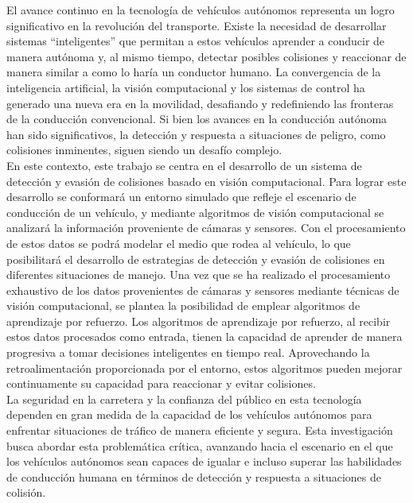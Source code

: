 \noindent
El avance continuo en la tecnología de vehículos autónomos representa un logro significativo en la revolución del transporte.
Existe la necesidad de desarrollar sistemas ``inteligentes'' que permitan a estos vehículos aprender a conducir de manera autónoma y,
al mismo tiempo, detectar posibles colisiones y reaccionar de manera similar a como lo haría un conductor humano.
La convergencia de la inteligencia artificial, la visión computacional y los sistemas de control ha generado una nueva era en la movilidad,
desafiando y redefiniendo las fronteras de la conducción convencional.
Si bien los avances en la conducción autónoma han sido significativos, la detección y respuesta a
situaciones de peligro, como colisiones inminentes, siguen siendo un desafío complejo.\\ \newline
En este contexto, este trabajo se centra en el desarrollo de un sistema de detección y evasión de colisiones basado en visión computacional.
Para lograr este desarrollo se conformará un entorno simulado que refleje el escenario de conducción de un vehículo,
y mediante algoritmos de visión computacional se analizará la información proveniente de cámaras y sensores.
Con el procesamiento de estos datos se podrá modelar el medio que rodea al vehículo, lo que posibilitará
el desarrollo de estrategias de detección y evasión de colisiones en diferentes situaciones de manejo.
Una vez que se ha realizado el procesamiento exhaustivo de los datos provenientes de cámaras y sensores mediante técnicas de visión computacional,
se plantea la posibilidad de emplear algoritmos de aprendizaje por refuerzo.
Los algoritmos de aprendizaje por refuerzo, al recibir estos datos procesados como entrada, tienen la capacidad de aprender de manera progresiva
a tomar decisiones inteligentes en tiempo real.
Aprovechando la retroalimentación proporcionada por el entorno, estos algoritmos pueden mejorar continuamente su capacidad para reaccionar y evitar colisiones.\\ \newline
La seguridad en la carretera y la confianza del público en esta tecnología dependen en gran medida de la capacidad
de los vehículos autónomos para enfrentar situaciones de tráfico de manera eficiente y segura.
Esta investigación busca abordar esta problemática crítica, avanzando hacia el escenario en el que los vehículos autónomos
sean capaces de igualar e incluso superar las habilidades de conducción humana en términos de detección y respuesta
a situaciones de colisión.